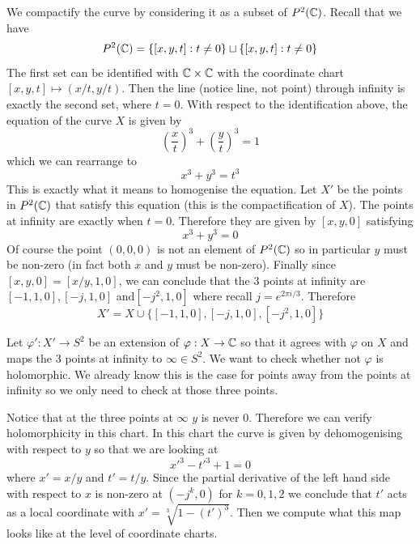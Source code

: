 We compactify the curve by considering it as a subset of $P^2(\mathbb{C})$. Recall that we have 
$$P^2(\mathbb{C}) = \{[x, y, t]: t \neq 0\} \sqcup \{[x, y, t]: t \neq 0\} $$
The first set can be identified with $\mathbb{C} \times \mathbb{C}$ with the coordinate chart $[x, y, t] \mapsto (x/t, y/t)$. Then the line (notice line, not point) through infinity is exactly the second set, where $t = 0$.  With respect to the identification above, the equation of the curve $X$ is given by 
$$ \left(\frac{x}{t}\right)^3 + \left( \frac{y}{t} \right)^3 = 1 $$
which we can rearrange to 
$$x^3 + y^3 = t^3$$
This is exactly what it means to homogenise the equation. Let $X'$ be the points in $P^2(\mathbb{C})$ that satisfy this equation (this is the compactification of $X$). The points at infinity are exactly when $t = 0$. Therefore they are given by $[x, y, 0]$ satisfying
$$x^3 + y^3 = 0$$
Of course the point $(0, 0, 0)$ is not an element of $P^2(\mathbb{C})$ so in particular $y$ must be non-zero (in fact both $x$ and $y$ must be non-zero). Finally since $[x, y, 0] = [x/y, 1, 0]$, we can conclude that the 3 points at infinity are $[-1, 1, 0], [-j, 1, 0]$ and$[-j^2, 1, 0]$ where recall $j = e^{2\pi i/3}$. Therefore
$$X' = X \cup \{[-1, 1, 0], [-j, 1, 0], [-j^2, 1, 0]\}$$

Let $\varphi': X' \to S^2$ be an extension of $\varphi: X \to \mathbb{C}$ so that it agrees with $\varphi$ on $X$ and maps the 3 points at infinity to $\infty \in S^2$. We want to check whether not $\varphi$ is holomorphic. We already know this is the case for points away from the points at infinity so we only need to check at those three points. 

Notice that at the three points at $\infty$ $y$ is never 0. Therefore we can verify holomorphicity in this chart. In this chart the curve is given by dehomogenising with respect to $y$ so that we are looking at 
$$x'^3 - t'^3 + 1 = 0$$
where $x' = x/y$ and $t' = t/y$. Since the partial derivative of the left hand side with respect to $x$ is non-zero at $(-j^k, 0)$ for $k = 0, 1, 2$ we conclude that $t'$ acts as a local coordinate with $x' = \sqrt[3]{1 - (t')^3}$. Then we compute what this map looks like at the level of coordinate charts.

